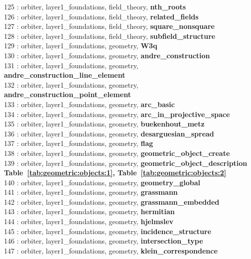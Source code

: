 125 : orbiter, layer1\_foundations, field\_theory, {\bf nth\_roots}\\
126 : orbiter, layer1\_foundations, field\_theory, {\bf related\_fields}\\
127 : orbiter, layer1\_foundations, field\_theory, {\bf square\_nonsquare}\\
128 : orbiter, layer1\_foundations, field\_theory, {\bf subfield\_structure}\\
129 : orbiter, layer1\_foundations, geometry, {\bf W3q}\\
130 : orbiter, layer1\_foundations, geometry, {\bf andre\_construction}\\
131 : orbiter, layer1\_foundations, geometry, {\bf andre\_construction\_line\_element}\\
132 : orbiter, layer1\_foundations, geometry, {\bf andre\_construction\_point\_element}\\
133 : orbiter, layer1\_foundations, geometry, {\bf arc\_basic}\\
134 : orbiter, layer1\_foundations, geometry, {\bf arc\_in\_projective\_space}\\
135 : orbiter, layer1\_foundations, geometry, {\bf buekenhout\_metz}\\
136 : orbiter, layer1\_foundations, geometry, {\bf desarguesian\_spread}\\
137 : orbiter, layer1\_foundations, geometry, {\bf flag}\\
138 : orbiter, layer1\_foundations, geometry, {\bf geometric\_object\_create}\\
139 : orbiter, layer1\_foundations, geometry, {\bf geometric\_object\_description Table~\ref{tab:geometric:objects:1},  Table~\ref{tab:geometric:objects:2}}\\
140 : orbiter, layer1\_foundations, geometry, {\bf geometry\_global}\\
141 : orbiter, layer1\_foundations, geometry, {\bf grassmann}\\
142 : orbiter, layer1\_foundations, geometry, {\bf grassmann\_embedded}\\
143 : orbiter, layer1\_foundations, geometry, {\bf hermitian}\\
144 : orbiter, layer1\_foundations, geometry, {\bf hjelmslev}\\
145 : orbiter, layer1\_foundations, geometry, {\bf incidence\_structure}\\
146 : orbiter, layer1\_foundations, geometry, {\bf intersection\_type}\\
147 : orbiter, layer1\_foundations, geometry, {\bf klein\_correspondence}\\
